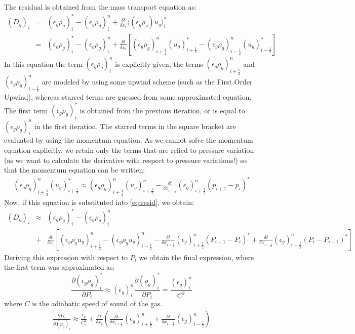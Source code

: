 The residual is obtained from the mass transport equation as:
\begin{eqnarray}
\label{eq:resid}
(D_g)_i & = &  (\epsilon_g \rho_g)_i^{*} - (\epsilon_g \rho_g)_i^{n}
+ \frac {\delta t} {\delta x_i } \langle (\epsilon_g \rho_g) u_g \rangle_i^{*} \\ \nonumber
& = & (\epsilon_g \rho_g)_i^{*} - (\epsilon_g \rho_g)_i^{n}
+ \frac {\delta t} {\delta x_i } 
\left[ 
(\epsilon_g \rho_g)^n_{i+\frac{1}{2}}(u_g)^*_{i+\frac{1}{2}} -
(\epsilon_g \rho_g)^n_{i-\frac{1}{2}}(u_g)^*_{i-\frac{1}{2}}
\right]
\end{eqnarray}
In this equation the term $(\epsilon_g \rho_g)_i^{n}$ is explicitly given,
the terms $(\epsilon_g \rho_g)^n_{i+\frac{1}{2}}$ and $(\epsilon_g \rho_g)^n_{i-\frac{1}{2}}$ are
modeled by using some upwind scheme (such as the First Order Upwind), whereas starred terms
are guessed from some approximated equation. The first term $(\epsilon_g \rho_g)_i^{*}$ is
obtained from the previous iteration, or is equal to $(\epsilon_g \rho_g)_i^{n}$ in the
first iteration. The starred terms in the square bracket are evaluated by using the momentum
equation. As we cannot solve the momentum equation explicitly, we retain only the terms
that are relied to pressure variation (as we want to calculate the derivative with respect
to pressure variations!) so that the momentum equation can be written:
\begin{eqnarray}
(\epsilon_g \rho_g)^n_{i+\frac{1}{2}}(u_g)^*_{i+\frac{1}{2}} \approx
(\epsilon_g \rho_g)^n_{i+\frac{1}{2}}(u_g)^n_{i+\frac{1}{2}} -
\frac {\delta t} {\delta x_{i+\frac{1}{2}}}
(\epsilon_g)^n_{i+\frac{1}{2}}(p_{i+1}-p_i)^*
\nonumber
\end{eqnarray}
Now, if this equation is substituted into \ref{eq:resid}, we obtain:
\begin{eqnarray}
(D_g)_i & \approx &  (\epsilon_g \rho_g)_i^{*} - (\epsilon_g \rho_g)_i^{n} \\
& + & \frac{\delta t}{\delta x_i } 
\left[ 
(\epsilon_g \rho_g u_g)^n_{i+\frac{1}{2}} - (\epsilon_g \rho_g u_g)^n_{i-\frac{1}{2}} 
- \frac{\delta t}{\delta x_{i+\frac{1}{2}}} (\epsilon_g)^n_{i+\frac{1}{2}}(P_{i+1}-P_i)^*
+ \frac{\delta t}{\delta x_{i-\frac{1}{2}}} (\epsilon_g)^n_{i-\frac{1}{2}}(P_i-P_{i-1})^*
\right]
\nonumber
\end{eqnarray}
Deriving this expression with respect to $P_i$ we obtain the final expression, where
the first term was approximated as:
\begin{displaymath}
\frac{\partial (\epsilon_g \rho_g)_i^{*} } {\partial P_i } \approx 
(\epsilon_g)_i^n \frac{\partial (\rho_g)_i^{*} } {\partial P_i } = 
\frac{(\epsilon_g)_i^n}{C^2}
\end{displaymath}
where $C$ is the adiabatic speed of sound of the gas.\\
\begin{eqnarray}
\frac{\partial D_{i}} {\partial (p_g)_{i}} \approx
\frac{\epsilon_g}{C_{i}^{2}} +
\frac {\delta t} {\delta x_i} \left(
\frac{\delta t}{\delta x_{i+\frac{1}{2}}}(\epsilon_g)^n_{i+\frac{1}{2}} + 
\frac{\delta t}{\delta x_{i-\frac{1}{2}}}(\epsilon_g)^n_{i-\frac{1}{2}} \right)
\nonumber
\end{eqnarray}
%
